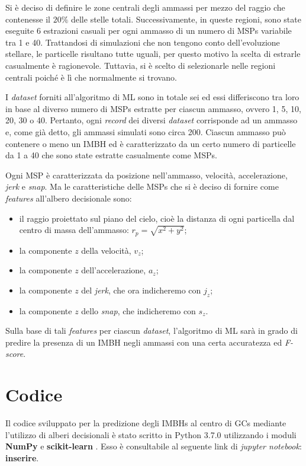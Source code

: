 Si è deciso di definire le zone centrali degli ammassi per mezzo del raggio che contenesse il $20\%$ delle stelle totali. Successivamente, in queste regioni, sono state eseguite 6 estrazioni casuali per ogni ammasso di un numero di MSPs variabile tra 1 e 40. Trattandosi di simulazioni che non tengono conto dell'evoluzione stellare, le particelle risultano tutte uguali, per questo motivo la scelta di estrarle casualmente è ragionevole. Tuttavia, si è scelto di selezionarle nelle regioni centrali poiché è lì che normalmente si trovano. 

I \textit{dataset} forniti all'algoritmo di ML sono in totale sei ed essi differiscono tra loro in base al diverso numero di MSPs estratte per ciascun ammasso, ovvero 1, 5, 10, 20, 30 o 40.
Pertanto, ogni \textit{record} dei diversi \textit{dataset} corrisponde ad un ammasso e, come già detto, gli ammassi simulati sono circa 200. Ciascun ammasso può contenere o meno un IMBH ed è caratterizzato da un certo numero di particelle da 1 a 40 che sono state estratte casualmente come MSPs. 

Ogni MSP è caratterizzata da posizione nell'ammasso, velocità, accelerazione, \textit{jerk} e \textit{snap}. Ma le caratteristiche delle MSPs che si è deciso di fornire come \textit{features} all'albero decisionale sono: 
\begin{itemize}
    \item il raggio proiettato sul piano del cielo, cioè la distanza di ogni particella dal centro di massa dell'ammasso: $r_{p}=\sqrt{x^{2}+y^{2}}$;
    \item la componente $z$ della velocità, $v_{z}$;
    \item la componente $z$ dell'accelerazione, $a_{z}$;
    \item la componente $z$ del \textit{jerk}, che ora indicheremo con $j_{z}$;
    \item la componente $z$ dello \textit{snap}, che indicheremo con $s_{z}$.
\end{itemize}

Sulla base di tali \textit{features} per ciascun \textit{dataset}, l'algoritmo di ML sarà in grado di predire la presenza di un IMBH negli ammassi con una certa accuratezza ed \textit{F-score}.

\section{Codice}
Il codice sviluppato per la predizione degli IMBHs al centro di GCs mediante l'utilizzo di alberi decisionali è stato scritto in Python 3.7.0 utilizzando i moduli \textbf{NumPy} \cite{numpy:online} e \textbf{scikit-learn} \cite{sklearn:online}. Esso è consultabile al seguente link di \textit{jupyter notebook}: \textbf{inserire}.

